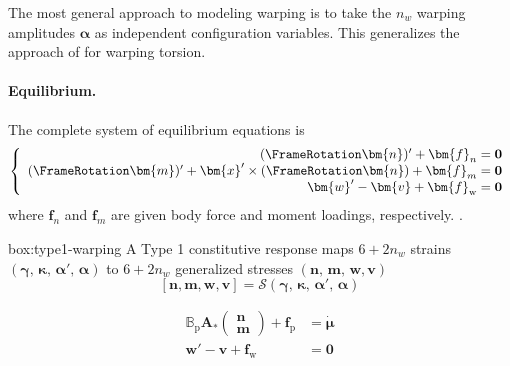 
The most general approach to modeling warping is to take the \(n_w\) warping amplitudes \(\bm{\alpha}\) as independent configuration variables. 
This generalizes the approach of \cite{reissner1952nonuniform} for warping torsion.

\paragraph{Equilibrium.}
%
The complete system of equilibrium equations is
\begin{equation} 
\left\{\begin{array}{r}
(\FrameRotation \bm{n})^{\prime}+{\bm{f}}_n=\mathbf{0} \\
(\FrameRotation \bm{m})^{\prime}+\bm{x}^{\prime} \times (\FrameRotation \bm{n}) +{\bm{f}}_m=\mathbf{0} \\
\bm{w}^{\prime}-\bm{v} + \bm{f}_{\rm w} = \mathbf{0}
\end{array}\right. 
\label{eq:finite-equilibrium}
\end{equation}
where \(\bm{f}_n\) and \(\bm{f}_m\) are given body force and moment loadings, respectively. 
\citep{antman1974kirchhoffs,simo1991geometricallyexact,klinkel2003anisotropic}. 

\vspace{1ex}
\begin{ambox}{box:type1-warping}
A Type 1 constitutive response maps \(6+2n_w\) strains \((\bm{\gamma},\, \bm{\kappa},\, \bm{\alpha}',\, \bm{\alpha})\) to \(6+ 2n_w\) generalized stresses \((\bm{n},\, \bm{m},\,\bm{w},\bm{v})\)
\[
[\bm{n},\bm{m},\bm{w},\bm{v}] = \mathcal{S}(\bm{\gamma},\, \bm{\kappa},\, \bm{\alpha}',\, \bm{\alpha})
\]

\begin{equation}
\begin{aligned}
    \mathbb{B}_{\mathrm{p}} \bm{A}_*\begin{pmatrix} \bm{n} \\ \bm{m} \end{pmatrix} + \bm{f}_{\mathrm{p}} &= \dot{\bm{\mu}} \\ 
    \bm{w}' - \bm{v} + \bm{f}_{\mathrm{w}} &= \mathbf{0}
\end{aligned}
\end{equation}
\end{ambox}


